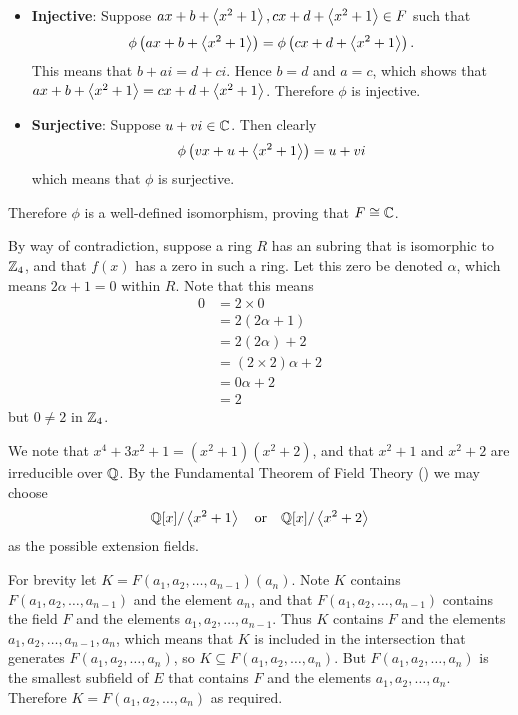 \begin{questions}
\begin{itemize}
        \item \textbf{Injective}: Suppose $ax + b + \left\langle x^2+1\right\rangle, cx + d + \left\langle x^2+1\right\rangle \in F$ such that
        \[
            \phi\left(ax + b + \left\langle x^2+1\right\rangle\right) = \phi\left(cx + d + \left\langle x^2+1\right\rangle\right).
        \]
        This means that $b + ai = d + ci$. Hence $b = d$ and $a = c$, which shows that $ax + b + \left\langle x^2+1\right\rangle = cx + d + \left\langle x^2+1\right\rangle$. Therefore $\phi$ is injective.

        \item \textbf{Surjective}: Suppose $u + vi \in \mathbb{C}$. Then clearly
        \[
            \phi\left(vx + u + \left\langle x^2+1\right\rangle\right) = u + vi
        \]
        which means that $\phi$ is surjective.
    \end{itemize}
    Therefore $\phi$ is a well-defined isomorphism, proving that $F \cong \mathbb{C}$.

    \item By way of contradiction, suppose a ring $R$ has an subring that is isomorphic to $\mathbb{Z}_4$, and that $f(x)$ has a zero in such a ring. Let this zero be denoted $\alpha$, which means $2\alpha + 1 = 0$ within $R$. Note that this means
    \begin{align*}
        0 &= 2\times0\\
        &= 2(2\alpha + 1)\\
        &= 2(2\alpha) + 2\\
        &= (2 \times 2)\alpha + 2\\
        &= 0\alpha + 2\\
        &= 2
    \end{align*}
    but $0 \neq 2$ in $\mathbb{Z}_4$.

    \item We note that $x^4 + 3x^2 + 1 = (x^2+1)(x^2+2)$, and that $x^2+1$ and $x^2 + 2$ are irreducible over $\mathbb{Q}$. By the Fundamental Theorem of Field Theory () we may choose
    \[
        \mathbb{Q}[x]/\left\langle x^2+1\right\rangle \quad\text{or}\quad \mathbb{Q}[x]/\left\langle x^2+2\right\rangle
    \]
    as the possible extension fields.

    \item For brevity let $K = F(a_1, a_2, \dots, a_{n-1})(a_n)$. Note $K$ contains $F(a_1, a_2, \dots, a_{n-1})$ and the element $a_n$, and that $F(a_1, a_2, \dots, a_{n-1})$ contains the field $F$ and the elements $a_1, a_2, \dots, a_{n-1}$. Thus $K$ contains $F$ and the elements $a_1, a_2, \dots, a_{n-1}, a_n$, which means that $K$ is included in the intersection that generates $F(a_1, a_2, \dots, a_n)$, so $K \subseteq F(a_1, a_2, \dots, a_n)$. But $F(a_1, a_2, \dots, a_n)$ is the smallest subfield of $E$ that contains $F$ and the elements $a_1, a_2, \dots, a_n$. Therefore $K = F(a_1, a_2, \dots, a_n)$ as required.


\end{questions}
